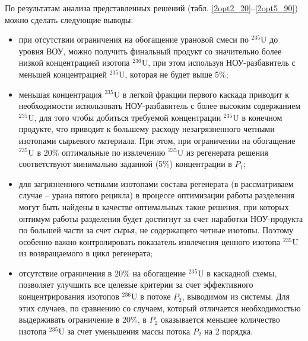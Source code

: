 \begin{enumerate}
\end{enumerate}




По результатам анализа представленных решений (табл. \ref{2opt2_20}--\ref{2opt5_90}) можно сделать следующие выводы:
\begin{itemize}
    \item при отсутствии ограничения на обогащение урановой смеси по $^{235}$U до уровня ВОУ, можно получить финальный продукт со значительно более низкой концентрацией изотопа $^{236}$U, при этом используя НОУ-разбавитель с меньшей концентрацией $^{235}$U, которая не будет выше 5\%;
    \item меньшая концентрация $^{235}$U в легкой фракции первого каскада приводит к необходимости использовать НОУ-разбавитель с более высоким содержанием $^{235}$U, для того чтобы добиться требуемой концентрации $^{235}$U в конечном продукте, что приводит к большему расходу незагрязненного четными изотопами сырьевого материала. При этом, при ограничении на обогащение $^{235}$U в 20\% оптимальные по извлечению $^{235}$U из регенерата решения соответствуют минимально заданной (5\%) концентрации в $P_1$;
    \item для загрязненного четными изотопами состава регенерата (в рассматриваем случае -- урана пятого рецикла) в процессе оптимизации работы разделения могут быть найдены в качестве оптимальных такие решения, при которых оптимум работы разделения будет достигнут за счет наработки НОУ-продукта по большей части за счет сырья, не содержащего четные изотопы. Поэтому особенно важно контролировать показатель извлечения ценного изотопа $^{235}$U из возвращаемого в цикл регенерата;
    \item отсутствие ограничения в 20\% на обогащение $^{235}$U в каскадной схемы, позволяет улучшить все целевые критерии за счет эффективного концентрирования изотопов $^{236}$U в потоке $P_2$, выводимом из системы. Для этих случаев, по сравнению со случаем, который отличается необходимостью выдерживать ограничение в 20\%, в $P_2$ оказывается меньшее количество изотопа $^{235}$U за счет уменьшения массы потока $P_2$ на 2 порядка. 
\end{itemize}


